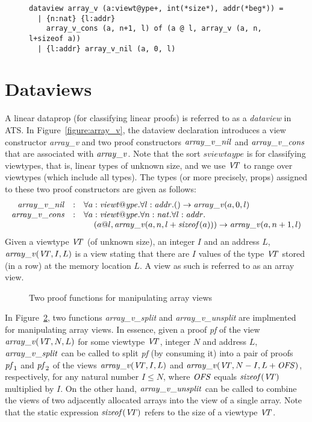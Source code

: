 \begin{figure}
\begin{verbatim}
dataview array_v (a:viewt@ype+, int(*size*), addr(*beg*)) =
  | {n:nat} {l:addr}
    array_v_cons (a, n+1, l) of (a @ l, array_v (a, n, l+sizeof a))
  | {l:addr} array_v_nil (a, 0, l)
\end{verbatim}
\caption{}
\label{figure:array_get_set_elt_at.dats}
\end{figure}
\section{Dataviews}
A linear dataprop (for classifying linear proofs) is referred to as a {\it
dataview} in ATS. In Figure~\ref{figure:array_v}, the dataview declaration
introduces a view constructor {\it array\_v} and two proof constructors
${\it array\_v\_nil}$ and ${\it array\_v\_cons}$ that are associated with
${\it array\_v}$.  Note that the sort $sviewtaype$ is for classifying
viewtypes, that is, linear types of unknown size, and we use ${\it V\!\!T}$ to range
over viewtypes (which include all types).  The types (or more precisely, props)
assigned to these two proof constructors are given as follows:
\[\begin{array}{rcl}
{\it array\_v\_nil} & : &
\forall a:{\it viewt@ype}.\forall l:{\it addr}. () \rightarrow {\it array\_v} (a, 0, l) \\
{\it array\_v\_cons} & : &
\forall a:{\it viewt@ype}.\forall n:{\it nat}.\forall l:{\it addr}. \\
&&\kern12pt
(a @ l, {\it array\_v} (a, n, l+{\it sizeof}(a))) \rightarrow {\it array\_v} (a, n+1, l) \\
\end{array}\]
Given a viewtype ${\it V\!\!T}$ (of unknown size), an integer $I$ and an address
$L$, ${\it array\_v}({\it V\!\!T}, I, L)$ is a view stating that there are $I$
values of the type ${\it V\!\!T}$ stored (in a row) at the memory location $L$. A view
as such is referred to as an array view.

\begin{figure}

\caption{Two proof functions for manipulating array views}
\label{figure:array_v_split_unsplit.dats}
\end{figure}
In Figure~\ref{figure:array_v_split_unsplit.dats}, two functions {\it
array\_v\_split} and {\it array\_v\_unsplit} are implmented for
manipulating array views. In essence, given a proof {\it pf} of the view
${\it array\_v} ({\it V\!\!T}, N, L)$ for some viewtype ${\it V\!\!T}$, integer $N$ and
address $L$, ${\it array\_v\_split}$ can be called to split {\it pf} (by
consuming it) into a pair of proofs ${\it pf}_1$ and ${\it pf}_2$ of the
views ${\it array\_v} ({\it V\!\!T}, I, L)$ and ${\it array\_v} ({\it V\!\!T}, N-I, L+{\it
OFS})$, respectively, for any natural number $I\leq N$, where ${\it OFS}$ equals
${\it sizeof}({\it V\!\!T})$ multiplied by $I$. On the other hand, ${\it
array\_v\_unsplit}$ can be called to combine the views of two adjacently
allocated arrays into the view of a single array.  Note that the static
expression ${\it sizeof}({\it V\!\!T})$ refers to the size of a viewtype ${\it V\!\!T}$.

